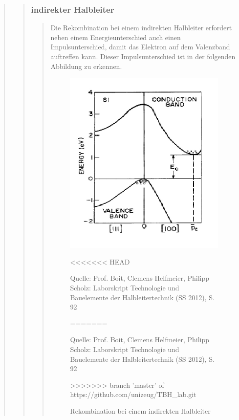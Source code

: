 \begin{quote}
\begin{quote}
\begin{quote}
            \end{quote}

            \subsubsection{indirekter Halbleiter}
            \begin{quote}
            Die Rekombination bei einem indirekten Halbleiter erfordert neben
            einem Energieunterschied auch einen Impulsunterschied, damit das
            Elektron auf dem Valenzband auftreffen kann. Dieser
            Impulsunterschied ist in der folgenden Abbildung zu erkennen.

            \begin{figure}[H]
                    \centering
                        \includegraphics[scale=0.73, trim = 1cm 0cm 1.5cm 0cm,
                        clip]{./Emissionsbilder/restliches/indirekt.png}
                        \caption{Rekombination bei einem indirekten Halbleiter}
<<<<<<< HEAD
                                \begin{center}
                                    \small Quelle: Prof. Boit, Clemens Helfmeier, Philipp Scholz: Laborskript Technologie und Bauelemente der Halbleitertechnik (SS 2012), S. 92
                                \end{center}
=======
                        		\begin{center}
                 					\small Quelle: Prof. Boit, Clemens Helfmeier, Philipp Scholz: Laborskript Technologie und Bauelemente der Halbleitertechnik (SS 2012), S. 92
             					\end{center}
>>>>>>> branch 'master' of https://github.com/unizeug/TBH_lab.git
                            \label{fig:./Emissionsbilder/restliches/indirekt.png}
            \end{figure}


\end{quote}
\end{quote}
\end{quote}
